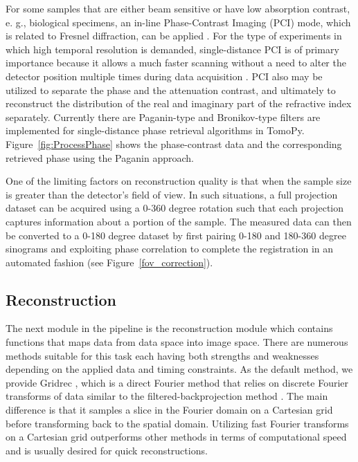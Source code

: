 \documentclass[pdf]{iucr}              %
\begin{document}
For some samples that are either beam sensitive or have low absorption contrast, e. g., biological specimens, an in-line Phase-Contrast Imaging (PCI) mode, which is related to Fresnel diffraction, can be applied \cite{Davis1999}. For the type of experiments in which high temporal resolution is demanded, single-distance PCI is of primary importance because it allows a much faster scanning without a need to alter the detector position multiple times during data acquisition \cite{Burvall:11}. PCI also may be utilized to separate the phase and the attenuation contrast, and ultimately to reconstruct the distribution of the real and imaginary part of the refractive index separately. Currently there are Paganin-type \cite{Paganin_2002} and Bronikov-type \cite{Bronnikov1999} filters are implemented for single-distance phase retrieval algorithms in TomoPy. Figure~\ref{fig:ProcessPhase} shows the phase-contrast data and the corresponding retrieved phase using the Paganin approach.

One of the limiting factors on reconstruction quality is that when the sample size is greater than the detector's field of view. In such situations, a full projection dataset can be acquired using a 0-360 degree rotation such that each projection captures information about a portion of the sample. The measured data can then be converted to a 0-180 degree dataset by first pairing 0-180 and 180-360 degree sinograms and exploiting phase correlation to complete the registration in an automated fashion (see Figure~\ref{fov_correction}). 

\subsection{Reconstruction}

The next module in the pipeline is the reconstruction module which contains functions that maps data from data space into image space. There are numerous methods suitable for this task each having both strengths and weaknesses depending on the applied data and timing constraints. As the default method, we provide Gridrec \cite{donath_spie_2006}, which is a direct Fourier method that relies on discrete Fourier transforms of data similar to the filtered-backprojection method \cite{kak_slaney}. The main difference is that it samples a slice in the Fourier domain on a Cartesian grid before transforming back to the spatial domain. Utilizing fast Fourier transforms on a Cartesian grid outperforms other methods in terms of computational speed and is usually desired for quick reconstructions.
\end{document}
